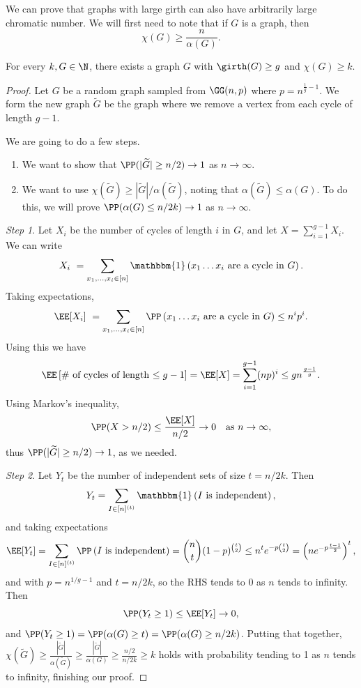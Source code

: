 \documentclass[a4paper]{scrartcl}
\begin{document}
We can prove that graphs with large girth can also have arbitrarily large chromatic number. We will first need to note that if $G$ is a graph, then
$$
\chi(G) \geq \frac{n}{\alpha(G)}.
$$

\begin{theorem}
	For every $k, G \in \N$, there exists a graph $G$ with $\girth(G) \geq g$ and $\chi(G) \geq k$.
\end{theorem} 
\begin{proof}
	Let $G$ be a random graph sampled from $\GG(n, p)$ where $p = n^{\frac{1}{g} - 1}$. We form the new graph $\widetilde{G}$ be the graph where we remove a vertex from each cycle of length $g - 1$.

	We are going to do a few steps.
	\begin{enumerate}
		\item We want to show that $\PP(|\widetilde{G}| \geq n/2) \rightarrow 1$ as $n \rightarrow \infty$.
		\item We want to use $\chi(\widetilde{G}) \geq |\widetilde{G}|/\alpha(\widetilde{G})$, noting that $\alpha(\widetilde{G}) \leq \alpha(G)$. To do this, we will prove $\PP(\alpha(G) \leq n/2k) \rightarrow 1$ as $n \rightarrow \infty$.
	\end{enumerate}

	\emph{Step 1}. Let $X_i$ be the number of cycles of length $i$ in $G$, and let $X = \sum_{i = 1}^{g - 1} X_i$. We can write
	\begin{align*}
		X_i \ = \sum_{x_1, \dots, x_i \in [n]} \mathbbm{1}\left(x_1 \dots x_i \text{ are a cycle in $G$}\right).
	\end{align*}
	Taking expectations,
	$$
\EE[X_i]\ = \sum_{x_1, \dots, x_i \in [n]} \PP\left(x_1 \dots x_i \text{ are a cycle in $G$}\right) \leq n^i p^i.
	$$
	Using this we have
	$$
	\EE\left[\#\text{ of cycles of length $\leq g - 1$}\right] = \EE[X] = \sum_{i = 1}^{g - 1} (np)^i \leq gn^{\frac{g - 1}{g}}.
	$$
Using Markov's inequality, 
$$
\PP(X > n/2) \leq \frac{\EE[X]}{n/2} \rightarrow 0 \quad \text{as }n \rightarrow \infty,
$$
thus $\PP(|\widetilde{G}| \geq n/2) \rightarrow 1$, as we needed.

\emph{Step 2}. Let $Y_t$ be the number of independent sets of size $t = n/2k$. Then
$$
Y_t = \sum_{I \in [n]^{(t)}} \mathbbm{1}\left(\text{$I$ is independent}\right),
$$
and taking expectations
$$
\EE[Y_t] = \sum_{I \in [n]^{(t)}} \PP\left(\text{$I$ is independent}\right) = \binom{n}{t}(1 - p)^{\binom{t}{2}} \leq n^t e^{-p\binom{t}{2}} = \left(n e^{-p \frac{t - 1}{2}}\right)^t,
$$
and with $p = n^{1/g - 1}$ and $t = n/2k$, so the RHS tends to 0 as $n$ tends to infinity. Then
$$
\PP(Y_t \geq 1) \leq \EE[Y_t] \rightarrow 0,
$$
and $\PP(Y_t \geq 1) = \PP(\alpha(G) \geq t) = \PP(\alpha(G) \geq n/2k)$. Putting that together, $\chi(\widetilde{G}) \geq \frac{|\widetilde{G}|}{\alpha(\widetilde{G})} \geq \frac{|\widetilde{G}|}{\alpha(G)} \geq \frac{n/2}{n/2k} \geq k$ holds with probability tending to 1 as $n$ tends to infinity, finishing our proof.
\end{proof}
\end{document}
